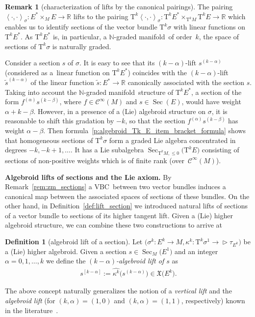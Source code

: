 \documentclass[10pt,a4paper]{amsart}
\newcommand{\grB}{{$\N$-graded manifold}}
\newcommand{\ZM}{{VBC}} %
\newcommand{\degree}{{order}}
\newcommand{\R}{\mathbb{R}}
\newcommand{\N}{\mathbb{N}}
\newcommand{\wh}[1]{\widehat{#1}} %
\newcommand{\Sec}{\operatorname{Sec}}
\newcommand{\X}{\mathfrak{X}}
\newcommand{\ra}{\rightarrow}
\newcommand{\TT}[1]{\mathrm{T}^{#1}} %
\newcommand{\Cf}{\mathcal{C}^\infty}
\def\relto{\rightarrow\!\!\vartriangleright} %
\def\<#1>{\left\langle #1\right\rangle}
\numberwithin{equation}{section}
\theoremstyle{definition}
\newtheorem{df}[thm]{Definition}
\newtheorem{rem}[thm]{Remark}
\begin{document}
\begin{rem}[characterization of lifts by the canonical pairings]\label{rem:lifts_pairings} The pairing $\<\cdot, \cdot>_\sigma\colon E^\ast\times_M E\ra \R$ lifts to the pairing $\TT{k} \<\cdot, \cdot>_\sigma\colon \TT{k} E^\ast \times_{\TT{k} M}\TT{k} E \ra \R$ which enables us to identify sections of the vector bundle $\TT{k} \sigma$ with linear functions on $\TT{k} E^\ast$. As $\TT{k} E^\ast$ is, in particular, a \grB\ of \degree\ $k$, the space of sections of $\TT{k} \sigma$ is naturally graded.

Consider a section $s$ of $\sigma$. It is easy to see that its $(k-\alpha)$-lift $s^{(k-\alpha)}$ (considered as a~linear function on $\TT{k} E^\ast$) coincides with the $(k-\alpha)$-lift $\tilde{s}^{(k-\alpha)}$ of the linear function $\tilde{s}\colon E^{\ast}\ra \R$ canonically associated with the section $s$. Taking into account the \grB\ structure of $\TT{k} E^\ast$, a section of the form
$f^{(\alpha)} s^{(k-\beta)}$, where $f\in \Cf(M)$ and $s\in \Sec(E)$, would have weight $\alpha + k- \beta$. However, in a presence of a (Lie) algebroid structure on $\sigma$, it is reasonable to shift this gradation by $-k$, so that the section $f^{(\alpha)} s^{(k-\beta)}$ has weight $\alpha-\beta$. Then formula~\eqref{p:algebroid_Tk_E_item_bracket_formula} shows that homogeneous sections of $\TT{k} \sigma$ form a graded Lie algebra concentrated in degrees $-k, -k+1, \ldots$. It has a Lie subalgebra $\Sec_{\TT{k}M, \leq 0} \big(\TT{k} E\big)$ consisting of sections of non-positive weights which is of finite rank (over~$\Cf(M)$).
\end{rem}

{\bf Algebroid lifts of sections and the Lie axiom.} By Remark~\ref{rem:zm_sections} a \ZM\ between two vector bundles induces a canonical map between the associated spaces of sections of these bundles. On the other hand, in Definition~\ref{def:lift_section} we introduced natural lifts of sections of a vector bundle to sections of its higher tangent lift. Given a (Lie) higher algebroid structure, we can combine these two constructions to arrive at
\begin{df}[algebroid lift of a section]\label{def:alg_lifts_sections}
Let $\big(\sigma^k\colon E^k\ra M,\kappa^k\colon \TT{k}\sigma^1\relto\tau_{E^k}\big)$ be a (Lie) higher algebroid. Given a section $s\in\Sec_M\big(E^1\big)$ and an integer $\alpha=0,1,\hdots,k$ we define the \emph{$(k-\alpha)$-algebroid lift of $s$} as
\begin{gather*} s^{[k-\alpha]}:=\wh{\kappa^k}\big(s^{(k-\alpha)}\big)\in \X\big(E^k\big).\end{gather*}
\end{df}
The above concept naturally generalizes the notion of a \emph{vertical lift} and the \emph{algebroid lift} (for $(k,\alpha)=(1,0)$ and $(k,\alpha)=(1,1)$, respectively) known in the literature~\cite{JG_PU_Algebroids_1999}.
\end{document}
